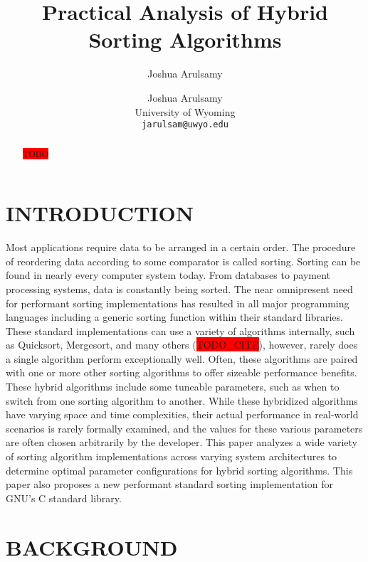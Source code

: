 \documentclass[letter, 12pt, conference]{ieeeconf}
\title{\LARGE \bf Practical Analysis of Hybrid Sorting Algorithms}
\author{Joshua Arulsamy}
\author{\parbox{3 in}{
\centering
Joshua Arulsamy\\
University of Wyoming\\
{\tt\small jarulsam@uwyo.edu}}}
\newcommand{\todo}{\colorbox{red}{TODO}}
\newcommand{\todocite}{\colorbox{red}{TODO\_CITE}}
\begin{document}
\maketitle
\thispagestyle{plain}
\pagestyle{plain}
\nocite{*}

\setlength{\textfloatsep}{2pt}

\begin{abstract}

	\todo

\end{abstract}

\section{INTRODUCTION}

Most applications require data to be arranged in a certain order. The procedure
of reordering data according to some comparator is called sorting. Sorting can
be found in nearly every computer system today. From databases to payment
processing systems, data is constantly being sorted. The near omnipresent need
for performant sorting implementations has resulted in all major programming
languages including a generic sorting function within their standard libraries.
These standard implementations can use a variety of algorithms internally, such
as Quicksort, Mergesort, and many others (\todocite), however, rarely does a
single algorithm perform exceptionally well. Often, these algorithms are paired
with one or more other sorting algorithms to offer sizeable performance
benefits. These hybrid algorithms include some tuneable parameters, such as when
to switch from one sorting algorithm to another. While these hybridized
algorithms have varying space and time complexities, their actual performance in
real-world scenarios is rarely formally examined, and the values for these
various parameters are often chosen arbitrarily by the developer. This paper
analyzes a wide variety of sorting algorithm implementations across varying
system architectures to determine optimal parameter configurations for hybrid
sorting algorithms. This paper also proposes a new performant standard sorting
implementation for GNU's C standard library.

\section{BACKGROUND}
\end{document}
